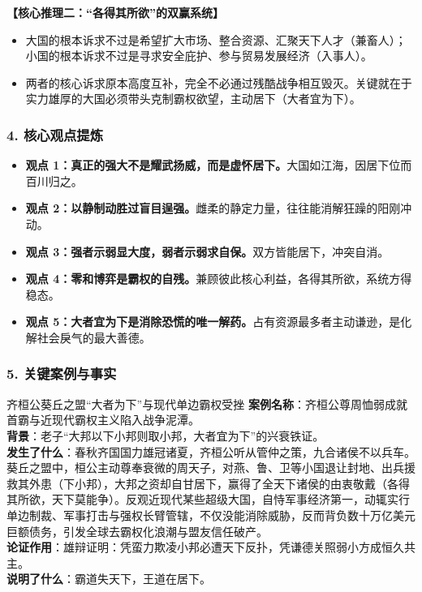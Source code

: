 \noindent\textbf{【核心推理二：“各得其所欲”的双赢系统】}
\begin{itemize}
    \item 大国的根本诉求不过是希望扩大市场、整合资源、汇聚天下人才（兼畜人）；小国的根本诉求不过是寻求安全庇护、参与贸易发展经济（入事人）。
    \item 两者的核心诉求原本高度互补，完全不必通过残酷战争相互毁灭。关键就在于实力雄厚的大国必须带头克制霸权欲望，主动居下（大者宜为下）。
\end{itemize}

\subsubsection{4. 核心观点提炼}
\begin{itemize}
    \item \textbf{观点 1：真正的强大不是耀武扬威，而是虚怀居下。}大国如江海，因居下位而百川归之。
    \item \textbf{观点 2：以静制动胜过盲目逞强。}雌柔的静定力量，往往能消解狂躁的阳刚冲动。
    \item \textbf{观点 3：强者示弱显大度，弱者示弱求自保。}双方皆能居下，冲突自消。
    \item \textbf{观点 4：零和博弈是霸权的自残。}兼顾彼此核心利益，各得其所欲，系统方得稳态。
    \item \textbf{观点 5：大者宜为下是消除恐慌的唯一解药。}占有资源最多者主动谦逊，是化解社会戾气的最大善德。
\end{itemize}

\subsubsection{5. 关键案例与事实}
\begin{CaseBox}{齐桓公葵丘之盟“大者为下”与现代单边霸权受挫}
\textbf{案例名称}：齐桓公尊周恤弱成就首霸与近现代霸权主义陷入战争泥潭。\\
\textbf{背景}：老子“大邦以下小邦则取小邦，大者宜为下”的兴衰铁证。\\
\textbf{发生了什么}：春秋齐国国力雄冠诸夏，齐桓公听从管仲之策，九合诸侯不以兵车。葵丘之盟中，桓公主动尊奉衰微的周天子，对燕、鲁、卫等小国退让封地、出兵援救其外患（下小邦），大邦之资却自甘居下，赢得了全天下诸侯的由衷敬戴（各得其所欲，天下莫能争）。反观近现代某些超级大国，自恃军事经济第一，动辄实行单边制裁、军事打击与强权长臂管辖，不仅没能消除威胁，反而背负数十万亿美元巨额债务，引发全球去霸权化浪潮与盟友信任破产。\\
\textbf{论证作用}：雄辩证明：凭蛮力欺凌小邦必遭天下反扑，凭谦德关照弱小方成恒久共主。\\
\textbf{说明了什么}：霸道失天下，王道在居下。
\end{CaseBox}

